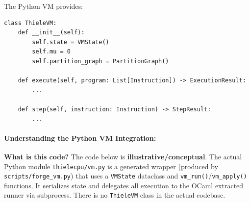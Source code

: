 The Python VM provides:
\begin{lstlisting}
class ThieleVM:
    def __init__(self):
        self.state = VMState()
        self.mu = 0
        self.partition_graph = PartitionGraph()
    
    def execute(self, program: List[Instruction]) -> ExecutionResult:
        ...
    
    def step(self, instruction: Instruction) -> StepResult:
        ...
\end{lstlisting}

\paragraph{Understanding the Python VM Integration:}

\textbf{What is this code?} The code below is \textbf{illustrative/conceptual}. The actual Python module \texttt{thielecpu/vm.py} is a generated wrapper (produced by \texttt{scripts/forge\_vm.py}) that uses a \texttt{VMState} dataclass and \texttt{vm\_run()}/\texttt{vm\_apply()} functions. It serializes state and delegates all execution to the OCaml extracted runner via subprocess. There is no \texttt{ThieleVM} class in the actual codebase.

